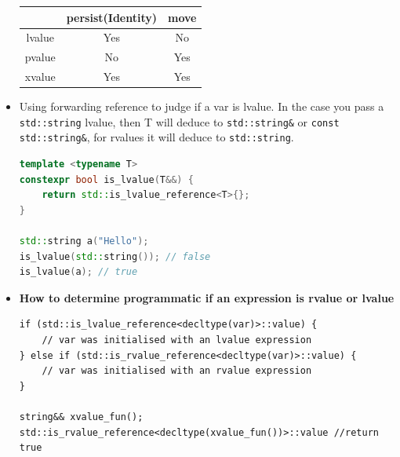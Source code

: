 \documentclass[a4paper,11pt,twoside]{book}
\newcommand{\tophline}{\hline }
\newcommand{\bottomhline}{\\ \hline }
\newcommand{\tophline}{ }
\newcommand{\bottomhline}{ }
\begin{document}
\begin{itemize}
	\begin{center}
		\begin{tabular}{|c|c|c|}
			\tophline
			& persist(Identity) & move \\
			\tophline
			lvalue & Yes & No \\
			\tophline
			pvalue & No & Yes \\
			\tophline
			xvalue & Yes & Yes \bottomhline
		\end{tabular}
	\end{center}
	



\item Using forwarding reference to judge if a var is lvalue. In the case you pass a \texttt{std::string} lvalue, then T will deduce to \texttt{std::string\&} or \texttt{const std::string\&}, for rvalues it will deduce to \texttt{std::string}.
\begin{lstlisting}[frame=single, language=c++]
template <typename T>
constexpr bool is_lvalue(T&&) {
	return std::is_lvalue_reference<T>{};
}

std::string a("Hello");
is_lvalue(std::string()); // false
is_lvalue(a); // true  
\end{lstlisting}



\item \textbf{How to determine programmatic if an expression is rvalue or lvalue}
\begin{lstlisting}[numbers=none]
if (std::is_lvalue_reference<decltype(var)>::value) {
	// var was initialised with an lvalue expression
} else if (std::is_rvalue_reference<decltype(var)>::value) {
	// var was initialised with an rvalue expression
}

string&& xvalue_fun();
std::is_rvalue_reference<decltype(xvalue_fun())>::value //return true
\end{lstlisting}

\end{itemize}
\end{document}
